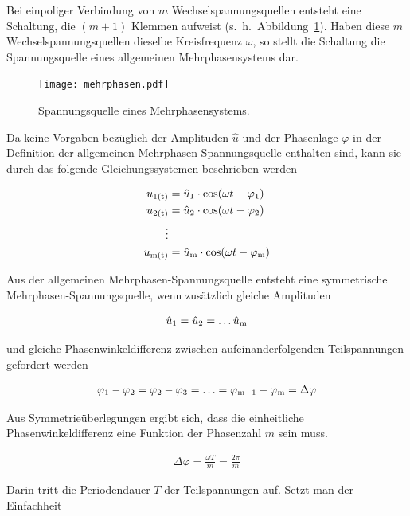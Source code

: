 Bei einpoliger Verbindung von $m$ Wechselspannungsquellen entsteht eine Schaltung, die $(m+1)$ Klemmen aufweist (s.~h.~Abbildung~\ref{fig:mehrphasen}).
Haben diese $m$ Wechselspannungsquellen dieselbe Kreisfrequenz $\omega$, so stellt die Schaltung die Spannungsquelle eines allgemeinen Mehrphasensystems dar.

\begin{figure}[!h]
\centering
\texttt{[image: mehrphasen.pdf]}
\label{fig:mehrphasen}
\caption{Spannungsquelle eines Mehrphasensystems.}
\end{figure}

Da keine Vorgaben bezüglich der Amplituden $\hat{u}$ und der Phasenlage $\varphi$ in der Definition der allgemeinen Mehrphasen-Spannungsquelle enthalten sind, kann sie \zB durch das folgende Gleichungssystemen beschrieben werden

\begin{align}
u_{\mathrm{1(t)}} &= \hat{u}_{\mathrm{1}} \cdot \cos(\omega t - \varphi_{\mathrm{1}}) \\
u_{\mathrm{2(t)}} &= \hat{u}_{\mathrm{2}} \cdot \cos(\omega t - \varphi_{\mathrm{2}}) \nonumber  \\
\vdots \nonumber \\
u_{\mathrm{m(t)}} &= \hat{u}_{\mathrm{m}} \cdot \cos(\omega t - \varphi_{\mathrm{m}}) \nonumber
\end{align}

Aus der allgemeinen Mehrphasen-Spannungsquelle entsteht eine symmetrische Mehrphasen-Spannungsquelle, wenn zusätzlich gleiche Amplituden

\begin{align*}
\hat{u}_{\mathrm{1}} = \hat{u}_{\mathrm{2}} = \ldots \hat{u}_{\mathrm{m}}
\end{align*}

und gleiche Phasenwinkeldifferenz zwischen aufeinanderfolgenden Teilspannungen gefordert werden

\begin{align*}
\varphi_{\mathrm{1}} - \varphi_{\mathrm{2}} = \varphi_{\mathrm{2}} - \varphi_{\mathrm{3}} = \ldots = \varphi_{\mathrm{m-1}} - \varphi_{\mathrm{m}} = \Delta \varphi
\end{align*}

Aus Symmetrieüberlegungen ergibt sich, dass die einheitliche Phasenwinkeldifferenz eine Funktion der Phasenzahl $m$ sein muss.

\begin{align}
\Delta \varphi = \frac{\omega T}{m} = \frac{2\pi}{m}
\end{align}

Darin tritt die Periodendauer $T$ der Teilspannungen auf.
Setzt man der Einfachheit

